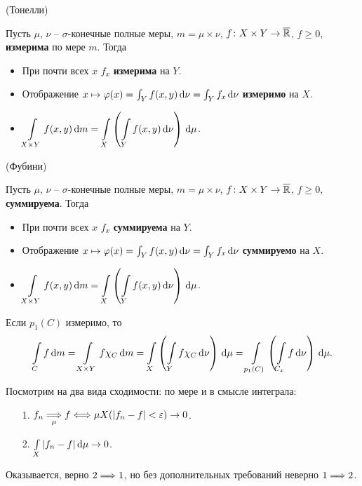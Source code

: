 \begin{theorem}(Тонелли)
    
    Пусть $\mu$, $\nu$ -- $\sigma$-конечные полные меры, $m = \mu \times \nu$,
    $f \colon X \times Y \to \overline{\mathbb{R}}$, $f \geqslant 0$, \textbf{измерима} по мере $m$.
    Тогда
    \begin{itemize}
        \item При почти всех $x$ $f_x$ \textbf{измерима} на $Y$.
        \item Отображение $x \mapsto \varphi(x) = \int_{Y}{f(x, y) \,\mathrm{d}\nu} 
        = \int_{Y}{f_x \,\mathrm{d}\nu}$ \textbf{измеримо} на $X$.
        \item $\displaystyle \int\limits_{X \times Y}{f(x, y) \,\mathrm{d} m} 
            = \int\limits_{X}{\left(\int\limits_{Y}{f(x, y) \,\mathrm{d}\nu}\right) \,\mathrm{d}\mu}$.
    \end{itemize} 
\end{theorem}

\begin{theorem}(Фубини)
    
    Пусть $\mu$, $\nu$ -- $\sigma$-конечные полные меры, $m = \mu \times \nu$,
    $f \colon X \times Y \to \overline{\mathbb{R}}$, $f \geqslant 0$, \textbf{суммируема}.
    Тогда
    \begin{itemize}
        \item При почти всех $x$ $f_x$ \textbf{суммируема} на $Y$.
        \item Отображение $x \mapsto \varphi(x) = \int_{Y}{f(x, y) \,\mathrm{d}\nu} 
            = \int_{Y}{f_x \,\mathrm{d}\nu}$ \textbf{суммируемо} на $X$.
        \item $\displaystyle \int\limits_{X \times Y}{f(x, y) \,\mathrm{d} m} 
            = \int\limits_{X}{\left(\int\limits_{Y}{f(x, y) \,\mathrm{d}\nu}\right) \,\mathrm{d}\mu}$.
    \end{itemize} 
\end{theorem}

\begin{corollary}
    Если $p_1(C)$ измеримо, то
\[
    \int\limits_{C}{f \,\mathrm{d} m} = \int\limits_{X \times Y}{f \chi_C \,\mathrm{d} m} 
    = \int\limits_{X}{\left(\int\limits_{Y}{f \chi_C \,\mathrm{d}\nu}\right) \,\mathrm{d}\mu}
    = \int\limits_{p_1(C)}{\left(\int\limits_{C_x}{f \,\mathrm{d}\nu}\right) \,\mathrm{d}\mu}
.\]
\end{corollary}

\begin{remark}
    Посмотрим на два вида сходимости: по мере и в смысле интеграла:
    \begin{itemize}
        \item[1.] $f_n \underset{\mu}{\Longrightarrow} f \Longleftrightarrow \mu X(|f_n - f| < \varepsilon) \to 0$.
        \item[2.] $\int\limits_{X}{|f_n - f| \,\mathrm{d}\mu} \to 0$.
    \end{itemize} 
    Оказывается, верно $2 \Longrightarrow 1$, но без дополнительных требований неверно $1 \Longrightarrow 2$.
\end{remark}

